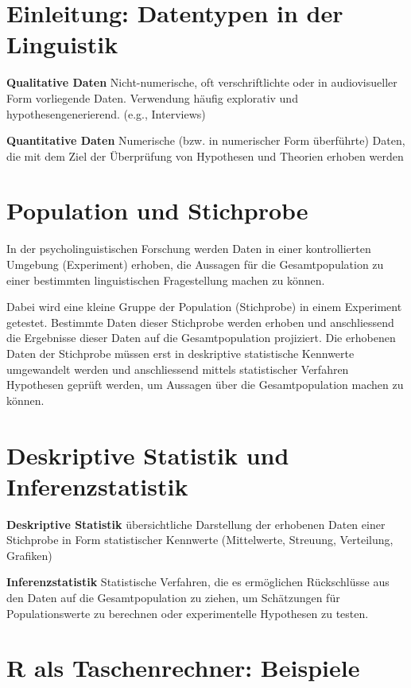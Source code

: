 \documentclass[]{book}
\begin{document}
\section{Einleitung: Datentypen in der
Linguistik}\label{einleitung-datentypen-in-der-linguistik}

\textbf{Qualitative Daten} Nicht-numerische, oft verschriftlichte oder
in audiovisueller Form vorliegende Daten. Verwendung häufig explorativ
und hypothesengenerierend. (e.g., Interviews)

\textbf{Quantitative Daten} Numerische (bzw. in numerischer Form
überführte) Daten, die mit dem Ziel der Überprüfung von Hypothesen und
Theorien erhoben werden

\section{Population und Stichprobe}\label{population-und-stichprobe}

In der psycholinguistischen Forschung werden Daten in einer
kontrollierten Umgebung (Experiment) erhoben, die Aussagen für die
Gesamtpopulation zu einer bestimmten linguistischen Fragestellung machen
zu können.

Dabei wird eine kleine Gruppe der Population (Stichprobe) in einem
Experiment getestet. Bestimmte Daten dieser Stichprobe werden erhoben
und anschliessend die Ergebnisse dieser Daten auf die Gesamtpopulation
projiziert. Die erhobenen Daten der Stichprobe müssen erst in
deskriptive statistische Kennwerte umgewandelt werden und anschliessend
mittels statistischer Verfahren Hypothesen geprüft werden, um Aussagen
über die Gesamtpopulation machen zu können.

\section{Deskriptive Statistik und
Inferenzstatistik}\label{deskriptive-statistik-und-inferenzstatistik}

\textbf{Deskriptive Statistik} übersichtliche Darstellung der erhobenen
Daten einer Stichprobe in Form statistischer Kennwerte (Mittelwerte,
Streuung, Verteilung, Grafiken)

\textbf{Inferenzstatistik} Statistische Verfahren, die es ermöglichen
Rückschlüsse aus den Daten auf die Gesamtpopulation zu ziehen, um
Schätzungen für Populationswerte zu berechnen oder experimentelle
Hypothesen zu testen.

\section{R als Taschenrechner:
Beispiele}\label{r-als-taschenrechner-beispiele}
\end{document}
